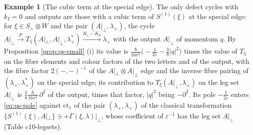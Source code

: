 \documentclass[11pt]{article}
\numberwithin{equation}{section}
\theoremstyle{plain}
\theoremstyle{definition}
\newtheorem{example}[theorem]{Example}
\newcommand{\Ap}{A|_{\perp}}
\begin{document}
\begin{example}[The cubic term at the special edge]
\label{ex:qs-cubic}
The only defect cycles with $k_I=0$ and outputs are those with a cubic term of $S^{(1)}(\xi)$ at the special edge: for $\xi\in S_+\otimes W$ and the pair $(\Ap,\lambda_+)$, the cycle $\Ap\xrightarrow{P}T_5(\Ap,\Ap,\lambda^*_+)\xrightarrow{K_\varepsilon-K_0}\lambda_+$ with the output $\Ap$ of momentum $q$. By Proposition \ref{prop:qs-small} (i) its value is $\frac{\hbar}{16\pi^2}\big(-\frac1{2\varepsilon}-\frac38|q|^2\big)$ times the value of $T_5$ on the fibre elements and colour factors of the two letters and of the output, with the fibre factor $2(-,-)^{-1}$ of the $\Ap\otimes\Ap$ edge and the inverse fibre pairing of $(\lambda_+,\lambda^*_+)$ on the special edge; its contribution to $\Upsilon_\xi(\Ap,\lambda_+)$ on the leg set $\Ap$ is $\frac38\frac{\hbar}{16\pi^2}\,\partial^2$ of the output, times that factor, $|q|^2$ being $-\partial^2$. Its pole $-\frac1{2\varepsilon}$ enters \eqref{eq:qs-pole} against $\mathrm{ct}_1$ of the pair $(\lambda_+,\lambda_+)$ of the classical transformation $\{S^{(1)}(\xi),\Ap\}\ni+\Gamma(\xi,\lambda)|_\perp$, whose coefficient of $\varepsilon^{-1}$ has the leg set $\Ap$ (Table c10-legsets).
\end{example}
\end{document}
